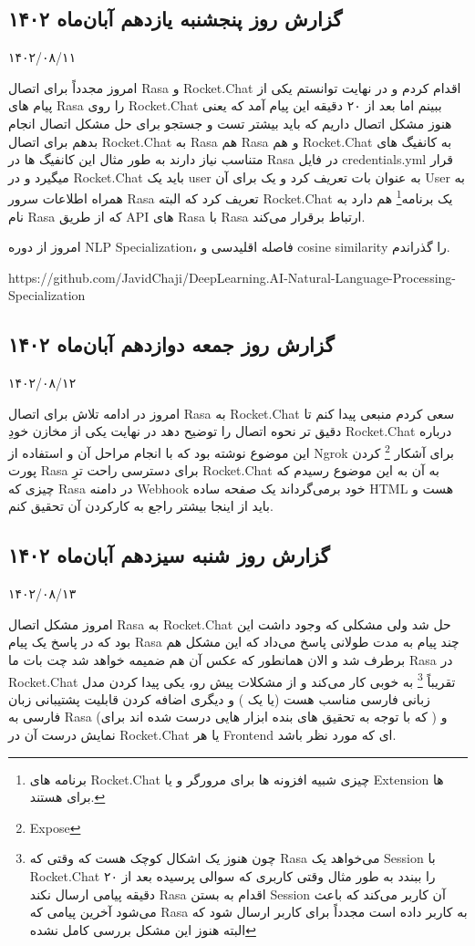 \subsection{گزارش روز پنجشنبه یازدهم آبان‌ماه ۱۴۰۲}

۱۴۰۲/۰۸/۱۱

امروز مجدداً برای اتصال Rasa و Rocket.Chat اقدام کردم و در نهایت توانستم یکی از پیام های Rasa را روی Rocket.Chat ببینم اما بعد از ۲۰ دقیقه این پیام آمد که یعنی هنوز مشکل اتصال داریم که باید بیشتر تست و جستجو برای حل مشکل اتصال انجام بدهم برای اتصال Rocket.Chat به Rasa هم Rasa و هم Rocket.Chat به کانفیگ های متناسب نیاز دارند به طور مثال این کانفیگ ها در Rasa در فایل credentials.yml قرار میگیرد و در Rocket.Chat باید یک user به عنوان بات تعریف کرد و یک  برای آن User به همراه اطلاعات سرور Rasa تعریف کرد که البته Rocket.Chat یک برنامه\footnote{برنامه های Rocket.Chat چیزی شبیه افزونه ها برای مرورگر و یا Extension ها برای  هستند.} هم دارد به نام Rasa که از طریق API های Rasa با Rasa ارتباط برقرار می‌کند.

امروز از دوره NLP Specialization، فاصله اقلیدسی و cosine similarity را گذراندم.

https://github.com/JavidChaji/DeepLearning.AI-Natural-Language-Processing-Specialization


\subsection{گزارش روز جمعه دوازدهم آبان‌ماه ۱۴۰۲}

۱۴۰۲/۰۸/۱۲

امروز در ادامه تلاش برای اتصال Rasa به Rocket.Chat سعی کردم منبعی پیدا کنم تا دقیق تر نحوه اتصال را توضیح دهد در نهایت یکی از مخازن خودِ Rocket.Chat درباره این موضوع نوشته بود که با انجام مراحل آن و استفاده از Ngrok برای آشکار \footnote{Expose} کردن پورت Rasa برای دسترسی راحت ترِ Rocket.Chat به آن به این موضوع رسیدم که چیزی که Rasa در  دامنه Webhook خود برمی‌گرداند یک صفحه ساده HTML هست و باید از اینجا بیشتر راجع به کارکردن آن تحقیق کنم.


\subsection{گزارش روز شنبه سیزدهم آبان‌ماه ۱۴۰۲}

۱۴۰۲/۰۸/۱۳

امروز مشکل اتصال Rasa به Rocket.Chat حل شد ولی مشکلی که وجود داشت این بود که در پاسخ یک پیام Rasa چند پیام به مدت طولانی  پاسخ می‌داد که این مشکل هم برطرف شد و الان همانطور که عکس آن هم ضمیمه خواهد شد چت بات ما Rasa در Rocket.Chat تقریباً \footnote{چون هنوز یک اشکال کوچک هست که وقتی که Rasa می‌خواهد یک Session با Rocket.Chat را ببندد به طور مثال وقتی کاربری که سوالی پرسیده بعد از ۲۰ دقیقه پیامی ارسال نکند Rasa اقدام به بستن Session آن کاربر می‌کند که باعث می‌شود آخرین پیامی که Rasa به کاربر داده است مجدداً برای کاربر ارسال شود که البته هنوز این مشکل بررسی کامل نشده} به خوبی کار می‌کند و از مشکلات پیش رو، یکی پیدا کردن مدل زبانی فارسی مناسب هست (یا یک ) و دیگری اضافه کردن قابلیت پشتیبانی زبان فارسی به Rasa (که با توجه به تحقیق های بنده ابزار هایی درست شده اند برای ) و نمایش درست آن در Rocket.Chat یا هر Frontend ای که مورد نظر باشد.


